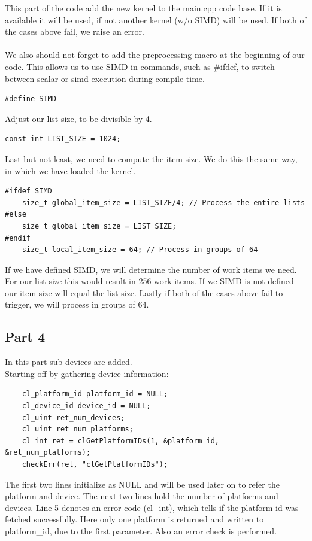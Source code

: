 \documentclass{article}
\begin{document}
\noindent This part of the code add the new kernel to the main.cpp code base.
If it is available it will be used, if not another kernel (w/o SIMD) will be used.
If both of the cases above fail, we raise an error. \\\\

\noindent We also should not forget to add the preprocessing macro at the beginning of our code.
This allows us to use SIMD in commands, such as \#ifdef, to switch between scalar or simd execution during compile time.

\begin{lstlisting}[caption=main.cpp]
    #define SIMD
\end{lstlisting}

\noindent Adjust our list size, to be divisible by 4.
\begin{lstlisting}[caption=main.cpp]
    const int LIST_SIZE = 1024;
\end{lstlisting}

\noindent Last but not least, we need to compute the item size.
We do this the same way, in which we have loaded the kernel.

\begin{lstlisting}[caption=main.cpp]
    #ifdef SIMD
    size_t global_item_size = LIST_SIZE/4; // Process the entire lists
#else
    size_t global_item_size = LIST_SIZE;
#endif
    size_t local_item_size = 64; // Process in groups of 64
\end{lstlisting}

\noindent If we have defined SIMD, we will determine the number of work items we need.
For our list size this would result in 256 work items.
If we SIMD is not defined our item size will equal the list size.
Lastly if both of the cases above fail to trigger, we will process in groups of 64.

\subsection*{Part 4}
In this part sub devices are added. \\
Starting off by gathering device information:
\begin{lstlisting}
    cl_platform_id platform_id = NULL;
    cl_device_id device_id = NULL;   
    cl_uint ret_num_devices;
    cl_uint ret_num_platforms;
    cl_int ret = clGetPlatformIDs(1, &platform_id, &ret_num_platforms);
    checkErr(ret, "clGetPlatformIDs");
\end{lstlisting}
The first two lines initialize as NULL and will be used later on to refer the platform and device.
The next two lines hold the number of platforms and devices.
Line 5 denotes an error code (cl\_int), which tells if the platform id was fetched successfully.
Here only one platform is returned and written to platform\_id, due to the first parameter. Also an error check is performed.\\\\
\end{document}
